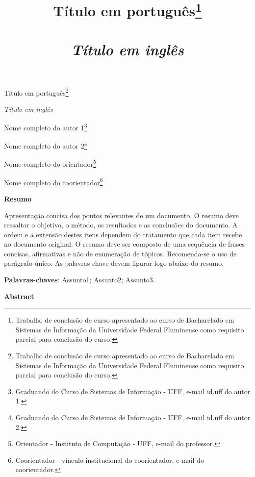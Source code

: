 \documentclass[article,a4paper,12pt,brazil,sumario=tradicional]{abntex2}
\title{ {\Large Título em português\footnote{Trabalho de conclusão de curso apresentado ao curso de Bacharelado em Sistemas de Informação da Universidade Federal Fluminense como requisito parcial para conclusão do curso.}\\\\
\vspace{.2} 
\textit{Título em inglês}\\}}
\date{ }
\begin{document}
\textual

\begin{center}
{\Large Título em português\footnote{Trabalho de conclusão de curso apresentado ao curso de Bacharelado em Sistemas de Informação da Universidade Federal Fluminense como requisito parcial para conclusão do curso.}

\textit{Título em inglês}\\}
\end{center}
\vspace{.2cm} 

\begin{flushright}
Nome completo do autor 1\footnote{Graduando do Curso de Sistemas de Informação - UFF, e-mail id.uff do autor 1.} 

Nome completo do autor 2\footnote{Graduando do Curso de Sistemas de Informação - UFF, e-mail id.uff do autor 2.} 

Nome completo do orientador\footnote{Orientador - Instituto de Computação - UFF, e-mail do professor.} 

Nome completo do coorientador\footnote{Coorientador - vínculo institucional do coorientador, e-mail do coorientador.}
\end{flushright}

\vspace{\onelineskip}

\begin{center}
    \textbf{Resumo}
\end{center}

\vspace{-.3cm}

\noindent Apresentação concisa dos pontos relevantes de um documento. O resumo deve ressaltar o objetivo, o método, os resultados e as conclusões do documento. A ordem e a extensão destes itens dependem do tratamento que cada item recebe no documento original. O resumo deve ser composto de uma sequência de frases concisas, afirmativas e não de enumeração de tópicos. Recomenda-se o uso de parágrafo único. As palavras-chave devem figurar logo abaixo do resumo.

\vspace{.4cm}
 
\noindent
\textbf{Palavras-chaves}: Assunto1; Assunto2; Assunto3. 
 
\vspace{\onelineskip}

\begin{center}
    \textbf{Abstract}
\end{center}
\end{document}
